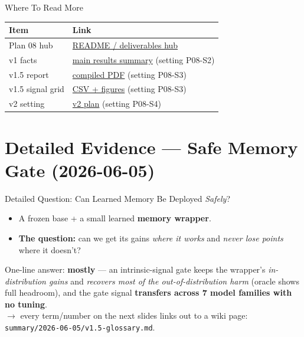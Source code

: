 \begin{frame}{Where To Read More}
  \small
  \begin{tabular}{p{}p{}}
    \toprule
    Item & Link \\
    \midrule
    Plan 08 hub &
    \href{https://github.com/BDeMo/research-notes/blob/main/notes/plans/08-model-outputs-delta-w/README.md}{README / deliverables hub} \\
    v1 facts &
    \href{https://github.com/BDeMo/research-notes/blob/main/notes/plans/08-model-outputs-delta-w/v1-results-2026-06-03.md}{main results summary} (setting P08-S2) \\
    v1.5 report &
    \href{https://github.com/BDeMo/research-notes/blob/main/notes/plans/08-model-outputs-delta-w/summary/2026-06-04/v1.5-intrinsic-gating-study-2026-06-04.pdf}{compiled PDF} (setting P08-S3) \\
    v1.5 signal grid &
    \href{https://github.com/BDeMo/research-notes/tree/main/notes/plans/08-model-outputs-delta-w/raw/grids-2026-06-04}{CSV + figures} (setting P08-S3) \\
    v2 setting &
    \href{https://github.com/BDeMo/research-notes/blob/main/notes/plans/08-model-outputs-delta-w/v2-plan.md}{v2 plan} (setting P08-S4) \\
    \bottomrule
  \end{tabular}
\end{frame}

\section{Detailed Evidence --- Safe Memory Gate (2026-06-05)}

\begin{frame}{Detailed Question: Can Learned Memory Be Deployed \emph{Safely}?}
  \large
  \begin{itemize}
    \item A frozen base + a small learned \textbf{memory wrapper}.
    \item \textbf{The question:} can we get its gains \emph{where it works} and \emph{never lose points} where it doesn't?
  \end{itemize}
  \vspace{1em}
  \normalsize One-line answer: \textbf{mostly} --- an intrinsic-signal gate keeps the wrapper's
  \emph{in-distribution gains} and \emph{recovers most of the out-of-distribution harm}
  (oracle shows full headroom), and the gate signal \textbf{transfers across 7 model families with no tuning}.
  \vspace{1.2em}\\
  \footnotesize $\rightarrow$ every term/number on the next slides links out to a wiki page: \texttt{summary/2026-06-05/v1.5-glossary.md}.
\end{frame}


